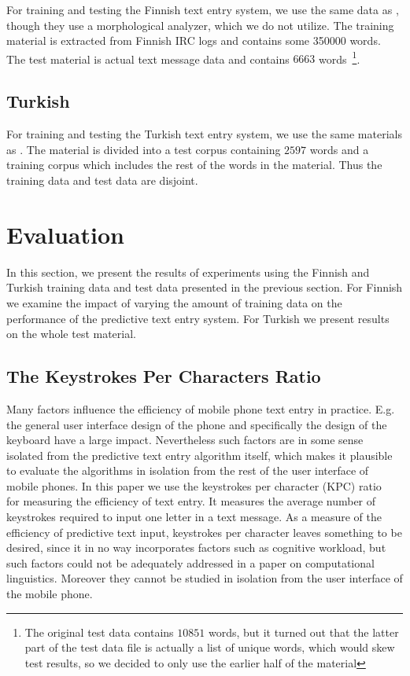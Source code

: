 \documentclass{llncs}
\begin{document}
For training and testing the Finnish text entry system, we use the
same data as \cite{silfverberg/2011/cla}, though they use a
morphological analyzer, which we do not utilize. The training material is extracted from Finnish IRC logs and contains some 350000 words. The test material is actual text message data and contains $6663$ words~\footnote{The original test data contains $10851$ words, but it turned out that the latter part of the test data file is actually a list of unique words, which would skew test results, so we decided to only use the earlier half of the material}. 

\subsection{Turkish}

For training and testing the Turkish text entry system, we use the
same materials as \cite{Tantug:2010}. The material is divided into a
test corpus containing $2597$ words and a training corpus which
includes the rest of the words in the material. Thus the training data
and test data are disjoint.

\section{Evaluation}\label{evaluation}

In this section, we present the results of experiments using the
Finnish and Turkish training data and test data presented in the
previous section. For Finnish we examine the impact of varying the
amount of training data on the performance of the predictive text
entry system. For Turkish we present results on the whole test
material.

\subsection{The Keystrokes Per Characters Ratio}

Many factors influence the efficiency of mobile phone text entry in
practice. E.g. the general user interface design of the phone and
specifically the design of the keyboard have a large
impact. Nevertheless such factors are in some sense isolated from the
predictive text entry algorithm itself, which makes it plausible to
evaluate the algorithms in isolation from the rest of the user
interface of mobile phones. In this paper we use the keystrokes per
character (KPC) ratio~\cite{MacKenzie02kspc} for measuring the
efficiency of text entry. It measures the average number of keystrokes
required to input one letter in a text message. As a measure of the
efficiency of predictive text input, keystrokes per character leaves
something to be desired, since it in no way incorporates factors such
as cognitive workload, but such factors could not be adequately
addressed in a paper on computational linguistics. Moreover they
cannot be studied in isolation from the user interface of the mobile
phone.
\end{document}
